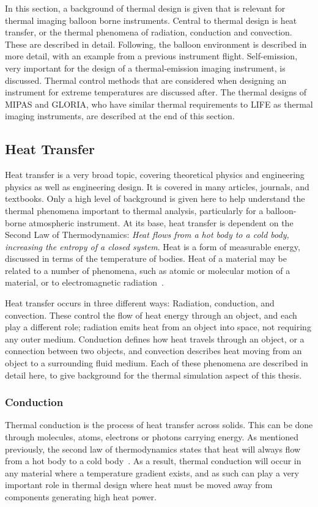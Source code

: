 In this section, a background of thermal design is given that is relevant for thermal imaging balloon borne instruments. Central to thermal design is heat transfer, or the thermal phenomena of radiation, conduction and convection. These are described in detail. Following, the balloon environment is described in more detail, with an example from a previous instrument flight. Self-emission, very important for the design of a thermal-emission imaging instrument, is discussed. Thermal control methods that are considered when designing an instrument for extreme temperatures are discussed after. The thermal designs of MIPAS and GLORIA, who have similar thermal requirements to LIFE as thermal imaging instruments, are described at the end of this section.

\subsection{Heat Transfer}\label{heat_transfer}
Heat transfer is a very broad topic, covering theoretical physics and engineering physics as well as engineering design. It is covered in many articles, journals, and textbooks. Only a high level of background is given here to help understand the thermal phenomena important to thermal analysis, particularly for a balloon-borne atmospheric instrument. At its base, heat transfer is dependent on the Second Law of Thermodynamics: \textit{Heat flows from a hot body to a cold body, increasing the entropy of a closed system}. Heat is a form of measurable energy, discussed in terms of the temperature of bodies. Heat of a material may be related to a number of phenomena, such as atomic or molecular motion of a material, or to electromagnetic radiation~\citep{Heat_Transfer_telescope}.

Heat transfer occurs in three different ways: Radiation, conduction, and convection. These control the flow of heat energy through an object, and each play a different role; radiation emits heat from an object into space, not requiring any outer medium. Conduction defines how heat travels through an object, or a connection between two objects, and convection describes heat moving from an object to a surrounding fluid medium. Each of these phenomena are described in detail here, to give background for the thermal simulation aspect of this thesis.

\subsubsection{Conduction}
Thermal conduction is the process of heat transfer across solids. This can be done through molecules, atoms, electrons or photons carrying energy. As mentioned previously, the second law of thermodynamics states that heat will always flow from a hot body to a cold body~\citep{Heat_Transfer_Basics}. As a result, thermal conduction will occur in any material where a temperature gradient exists, and as such can play a very important role in thermal design where heat must be moved away from components generating high heat power.

